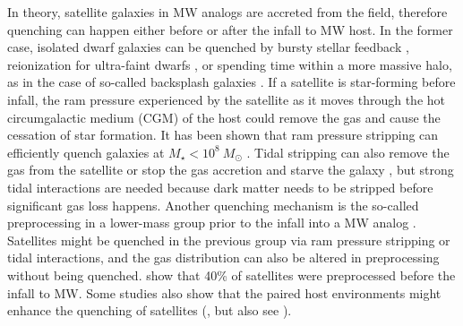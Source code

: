 \documentclass[twocolumn,astrosymb,twocolappendix]{aastex631}
\begin{document}
\begin{CJK*}{UTF8}{gbsn}
In theory, satellite galaxies in MW analogs are accreted from the field, therefore quenching can happen either before or after the infall to MW host. In the former case, isolated dwarf galaxies can be quenched by bursty stellar feedback \citep[e.g.,][]{Bahe2015,Kazantzidis2017,ElBadry2018}, reionization for ultra-faint dwarfs \citep[e.g.,][]{Bullock2000,Benson2002,Somerville2002,Tollerud2018,Applebaum2021}, or spending time within a more massive halo, as in the case of so-called backsplash galaxies \citep{Simpson2018,Benavides2021}. If a satellite is star-forming before infall, the ram pressure \citep[e.g.,][]{GunnGott1972,McCarthy2008,Emerick2016,Simpson2018,Tremmel2020,Samuel2022} experienced by the satellite as it moves through the hot circumgalactic medium (CGM) of the host could remove the gas and cause the cessation of star formation. It has been shown that ram pressure stripping can 
efficiently quench galaxies at $M_\star < 10^{8}\ M_\odot$ \citep{Fillingham2016,Simpson2018,Buck2019}. Tidal stripping can also remove the gas from the satellite or stop the gas accretion and starve the galaxy \citep{Simpson2018}, but strong tidal interactions are needed because dark matter needs to be stripped before significant gas loss happens. Another quenching mechanism is the so-called preprocessing in a lower-mass group prior to the infall into a MW analog \citep{Wetzel2015b,Jahn2022,Samuel2022}. Satellites might be quenched in the previous group via ram pressure stripping or tidal interactions, and the gas distribution can also be altered in preprocessing without being quenched. \citet{Samuel2022} show that 40\% of satellites were preprocessed before the infall to MW. Some studies also show that the paired host environments might enhance the quenching of satellites (\citealt{Garrison-Kimmel2019,Putman2021}, but also see \citealt{Samuel2022}). 


\end{CJK*}
\end{document}

